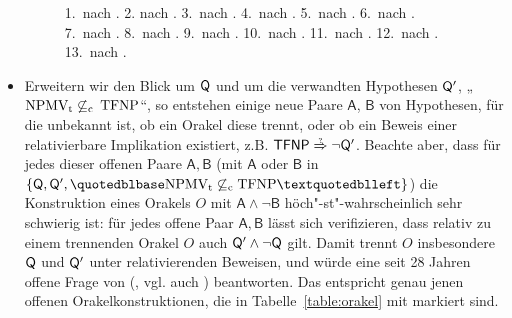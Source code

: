 \begin{itemize}[parsep=0pt,listparindent=\parindent,itemsep=5pt plus 1pt minus 1pt,midpenalty=0]
\begin{figure}[p]
{    1.~nach \textcite[Thm.~5]{rackoff_relativized_1982}. 
    2. nach \textcite[Thm.~4.1]{dose_further_2020}.
    3.~nach \textcite[Thm.~9]{ehrmanntraut_oracle_2022}.
    4.~nach \textcite[Thm.~4.1]{dose_np-completeness_2019}.
    5.~nach \textcite[Cor.~3.3]{dose_oracle_2020}.
    6.~nach \textcite[Thm.~3.2]{dose_further_2020}.
    7.~nach \textcite[Thm.~3.2]{fortnow_separability_2002}.
    8.~nach \textcite[Thm.~12.3]{fenner_inverting_2003}.
    9.~nach \textcite[Cor.~6.6]{glaser_disjoint_2004}.
    10.~nach \textcite[Thm.~5.1]{khaniki_new_2022}.
    11.~nach \textcite[Thm.~5.2]{khaniki_new_2022}.
    12.~nach \textcite[Satz~3.12]{dingel_separation_2022}.
    13.~nach \textcite[Cor.~6.34]{glaser_disjoint_2004}.
}\label{fig:oracles}
    \forcerectofloat
\end{figure}
        
\item Erweitern wir den Blick um $\mathsf{Q}$ und um die verwandten Hypothesen $\mathsf{Q}'$, „$\mathrm{NPMV_t} \not\subseteq_\mathrm c$ $\mathrm{TFNP}$“, so entstehen einige neue Paare $\mathsf{A}$, $\mathsf{B}$ von Hypothesen, für die unbekannt ist, ob ein Orakel diese trennt, oder ob ein Beweis einer relativierbare Implikation existiert, z.B. $\hTFNP\stackrel{\smash{\text{\raisebox{-1pt}{\tiny ?}}}}{\Rightarrow}\neg\hQ'$. Beachte aber, dass für jedes dieser offenen Paare $\mathsf{A,B}$ (mit $\mathsf A$ oder $\mathsf B$ in $\{\hQ, \hQ', „\NPMVt\not\subseteqc \TFNP“\}$) die Konstruktion eines Orakels $O$ mit $\mathsf{A\land \neg B}$ höch"-st"-wahrscheinlich sehr schwierig ist: für jedes offene Paar $\mathsf{A,B}$ lässt sich verifizieren, dass relativ zu einem trennenden Orakel $O$ auch $\mathsf{Q}'\land \neg \mathsf{Q}$ gilt. Damit trennt $O$ insbesondere $\mathsf{Q}$ und $\mathsf{Q}'$ unter relativierenden Beweisen, und würde eine seit 28 Jahren offene Frage von \citeauthor{fenner_inverting_2003} (\citeyear{fenner_inverting_2003}, vgl. auch \citeyear{fenner_inverting_1996}) beantworten. Das entspricht genau jenen offenen Orakelkonstruktionen, die in Tabelle~\ref{table:orakel} mit \dag{} markiert sind.


\end{itemize}
